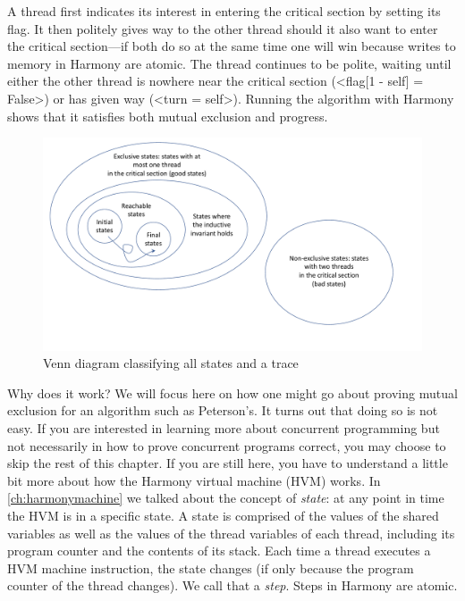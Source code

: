 \documentclass{report}
\begin{document}
A thread first indicates its interest in entering the critical section
by setting its flag.
It then politely gives way to the other thread should it also want to
enter the critical section---if both do so at the same time one will
win because writes to memory in Harmony are atomic.
The thread continues to be polite, waiting
until either the other thread is nowhere near the critical section
(<{flag[1 - self] = False}>) or has given way (<{turn = self}>).
Running the algorithm with Harmony shows that it satisfies both mutual
exclusion and progress.

\begin{figure}
\begin{center}
\includegraphics[width=6in]{figures/states-crop.pdf}
\end{center}
\caption{Venn diagram classifying all states and a trace}
\label{fig:states}
\end{figure}

%
%

Why does it work?  We will focus here on how one might go about proving
mutual exclusion for an algorithm such as Peterson's.
It turns out that doing so is not easy.
If you are interested in learning more about concurrent programming
but not necessarily in how to prove concurrent programs correct, you
may choose to skip the rest of this chapter.
If you are still here, you have to understand a little bit more about
how the Harmony virtual machine (HVM) works.
In \autoref{ch:harmonymachine} we talked about the concept of \emph{state}:
%
at any point in time the HVM is in a specific state.
A state is comprised of the values of the shared variables as well as
the values of the thread variables
%
of each thread, including its
program counter and the contents of its stack.
Each time a thread executes a HVM machine instruction, the
state changes (if only because the program counter of the thread
changes).  We call that a \emph{step}.
%
Steps in Harmony are atomic.
\end{document}
